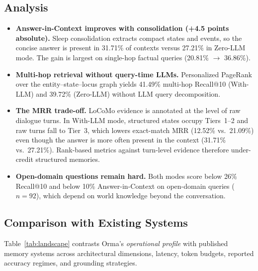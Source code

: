 \documentclass[11pt]{article}
\newcommand{\orma}{\mbox{Orma}}
\begin{document}
\subsection{Analysis}
\begin{itemize}
    \item \textbf{Answer-in-Context improves with consolidation (+4.5 points absolute).} Sleep consolidation extracts compact states and events, so the concise answer is present in 31.71\% of contexts versus 27.21\% in Zero-LLM mode. The gain is largest on single-hop factual queries (20.81\% $\rightarrow$ 36.86\%).
    \item \textbf{Multi-hop retrieval without query-time LLMs.} Personalized PageRank over the entity--state--locus graph yields 41.49\% multi-hop Recall@10 (With-LLM) and 39.72\% (Zero-LLM) without LLM query decomposition.
    \item \textbf{The MRR trade-off.} LoCoMo evidence is annotated at the level of raw dialogue turns. In With-LLM mode, structured states occupy Tiers~1--2 and raw turns fall to Tier~3, which lowers exact-match MRR (12.52\% vs.\ 21.09\%) even though the answer is more often present in the context (31.71\% vs.\ 27.21\%). Rank-based metrics against turn-level evidence therefore under-credit structured memories.
    \item \textbf{Open-domain questions remain hard.} Both modes score below 26\% Recall@10 and below 10\% Answer-in-Context on open-domain queries ($n=92$), which depend on world knowledge beyond the conversation.
\end{itemize}

\subsection{Comparison with Existing Systems}
Table~\ref{tab:landscape} contrasts \orma's \emph{operational profile} with published memory systems across architectural dimensions, latency, token budgets, reported accuracy regimes, and grounding strategies.
\end{document}
